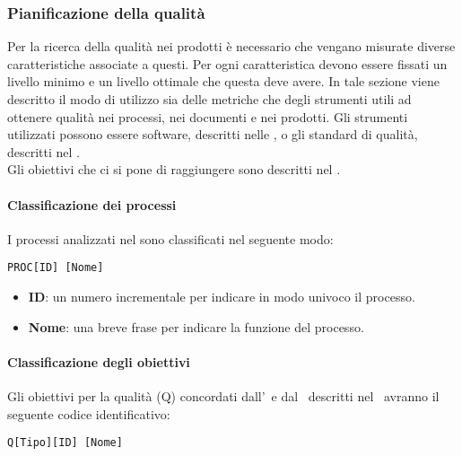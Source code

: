 		\subsubsection{Pianificazione della qualità}\label{Pianificazione qualita}
		Per la ricerca della qualità nei prodotti è necessario che vengano misurate diverse caratteristiche associate a questi.
		Per ogni caratteristica devono essere fissati un livello minimo e un livello ottimale che questa deve avere.
		In tale sezione viene descritto il modo di utilizzo sia delle metriche che degli strumenti utili ad ottenere qualità nei processi, nei documenti e nei prodotti.
		Gli strumenti utilizzati possono essere software, descritti nelle \Doc{\NdPv}, o gli standard di qualità, descritti nel \Doc{\PdQv}.\\
		Gli obiettivi che ci si pone di raggiungere sono descritti nel \Doc{\PdQv}.

			\paragraph{Classificazione dei processi}
			I processi analizzati nel \Doc{\PdQv} sono classificati nel seguente modo:

			\begin{center}
				\texttt{PROC[ID] [Nome]}
			\end{center}

			\begin{itemize}
				\item \textbf{ID}: un numero incrementale per indicare in modo univoco il processo.
				\item \textbf{Nome}: una breve frase per indicare la funzione del processo.
			\end{itemize}

			\paragraph{Classificazione degli obiettivi}
			Gli obiettivi per la qualità (Q) concordati dall'\Amm\ e dal \Ver\ descritti nel \PdQ\ avranno il seguente codice identificativo:

			\begin{center}
				\texttt{Q[Tipo][ID] [Nome]}
			\end{center}

